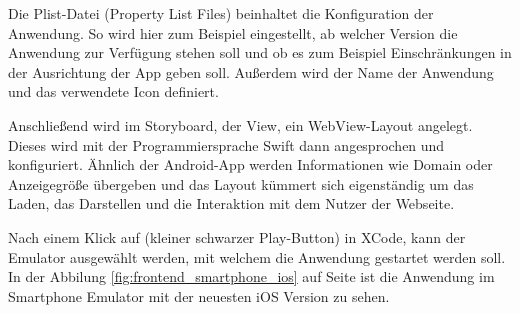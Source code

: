Die Plist-Datei (Property List Files) beinhaltet die Konfiguration der Anwendung. So wird hier zum Beispiel eingestellt,
ab welcher Version die Anwendung zur Verfügung stehen soll und ob es zum Beispiel Einschränkungen in der Ausrichtung der
App geben soll. Außerdem wird der Name der Anwendung und das verwendete Icon definiert.

Anschließend wird im Storyboard, der View, ein WebView-Layout angelegt. Dieses wird mit der Programmiersprache Swift dann
angesprochen und konfiguriert. Ähnlich der Android-App werden Informationen wie Domain oder Anzeigegröße übergeben und das
Layout kümmert sich eigenständig um das Laden, das Darstellen und die Interaktion mit dem Nutzer der Webseite.

Nach einem Klick auf  (kleiner schwarzer Play-Button) in XCode, kann der Emulator ausgewählt werden, mit welchem
die Anwendung gestartet werden soll. In der Abbilung \ref{fig:frontend_smartphone_ios} auf Seite
\pageref{fig:frontend_smartphone_ios} ist die Anwendung im Smartphone Emulator mit der neuesten iOS Version zu sehen.


